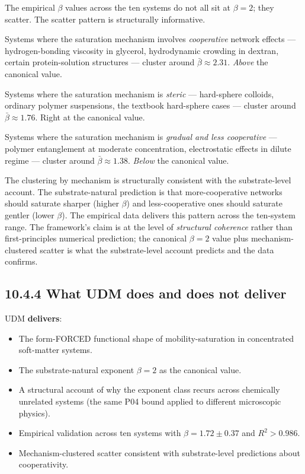 \documentclass[11pt]{book}
\begin{document}
The empirical $\beta$ values across the ten systems do not all sit at $\beta = 2$; they scatter. The scatter pattern is structurally informative.

Systems where the saturation mechanism involves \textit{cooperative} network effects — hydrogen-bonding viscosity in glycerol, hydrodynamic crowding in dextran, certain protein-solution structures — cluster around $\bar\beta \approx 2.31$. \textit{Above} the canonical value.

Systems where the saturation mechanism is \textit{steric} — hard-sphere colloids, ordinary polymer suspensions, the textbook hard-sphere cases — cluster around $\bar\beta \approx 1.76$. Right at the canonical value.

Systems where the saturation mechanism is \textit{gradual and less cooperative} — polymer entanglement at moderate concentration, electrostatic effects in dilute regime — cluster around $\bar\beta \approx 1.38$. \textit{Below} the canonical value.

The clustering by mechanism is structurally consistent with the substrate-level account. The substrate-natural prediction is that more-cooperative networks should saturate sharper (higher $\beta$) and less-cooperative ones should saturate gentler (lower $\beta$). The empirical data delivers this pattern across the ten-system range. The framework's claim is at the level of \textit{structural coherence} rather than first-principles numerical prediction; the canonical $\beta = 2$ value plus mechanism-clustered scatter is what the substrate-level account predicts and the data confirms.

\subsection{10.4.4 What UDM does and does not deliver}

UDM \textbf{delivers}:
\begin{itemize}
\item The form-FORCED functional shape of mobility-saturation in concentrated soft-matter systems.
\item The substrate-natural exponent $\beta = 2$ as the canonical value.
\item A structural account of why the exponent class recurs across chemically unrelated systems (the same P04 bound applied to different microscopic physics).
\item Empirical validation across ten systems with $\beta = 1.72 \pm 0.37$ and $R^2 > 0.986$.
\item Mechanism-clustered scatter consistent with substrate-level predictions about cooperativity.
\end{itemize}
\end{document}
